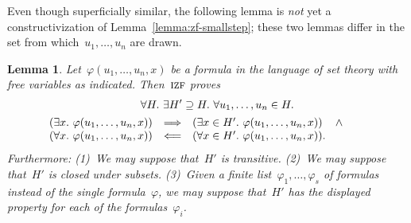 \documentclass[oneside,reqno]{amsart}
\theoremstyle{definition}
\theoremstyle{plain}
\newtheorem{lemma}[defn]{Lemma}
\theoremstyle{remark}
\renewcommand{\_}{\mathpunct{.}\,}
\newcommand{\?}{\,{:}\,}
\newcommand{\IZF}{\textsc{izf}}
\begin{document}
Even though superficially similar, the following lemma is \emph{not} yet a
constructivization of Lemma~\ref{lemma:zf-smallstep}; these two lemmas differ
in the set from which~$u_1,\ldots,u_n$ are drawn.

\begin{lemma}\label{lemma:izf-microstep}
Let~$\varphi(u_1,\ldots,u_n,x)$ be a formula in the language of set
theory with free variables as indicated. Then~$\IZF$ proves
\begin{multline*}
  {\qquad}\forall H\_
  \exists H' \supseteq H\_
  \forall u_1,\ldots,u_n \in H\_ \\
  \begin{array}{@{}rcl@{}}
  (\exists x\_ \varphi(u_1,\ldots,u_n,x)) &\Longrightarrow&
  (\exists x \in H'\_ \varphi(u_1,\ldots,u_n,x)) \quad\mathop{\wedge} \\
  (\forall x\_ \varphi(u_1,\ldots,u_n,x)) &\Longleftarrow&
  (\forall x \in H'\_ \varphi(u_1,\ldots,u_n,x)).\end{array}
  {\qquad}
\end{multline*}
Furthermore: (1)~We may suppose that~$H'$ is transitive. (2)~We may suppose
that~$H'$ is closed under subsets. (3)~Given a finite
list~$\varphi_1,\ldots,\varphi_s$ of formulas instead of the single
formula~$\varphi$, we may suppose that~$H'$ has the displayed property for each
of the formulas~$\varphi_i$.
\end{lemma}
\end{document}
